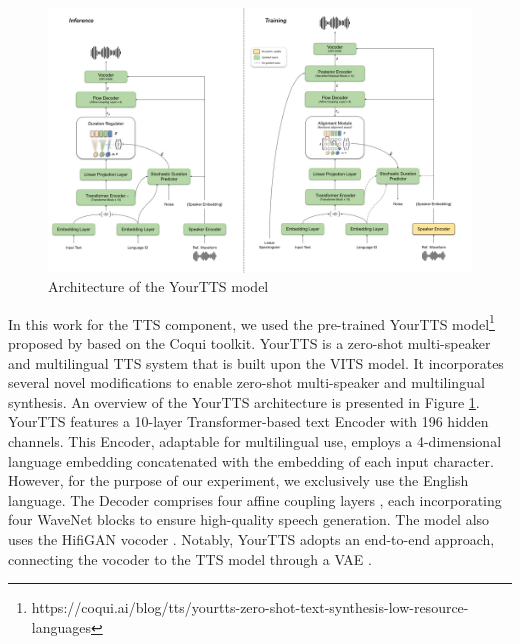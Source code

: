 \begin{figure}
    \begin{center}
        \includegraphics[scale=0.4]{imgs/YourTTS.png}
        \caption{Architecture of the YourTTS model\protect\footnotemark}
        \label{fig:YourTTS}
    \end{center}
\end{figure}

In this work for the \ac{TTS} component, we used the pre-trained YourTTS model\footnote{https://coqui.ai/blog/tts/yourtts-zero-shot-text-synthesis-low-resource-languages} proposed by \cite{casanova2022yourtts} based on the  Coqui toolkit. YourTTS is a zero-shot multi-speaker and multilingual \ac{TTS} system that is built upon the \ac{VITS} model. It incorporates several novel modifications to enable zero-shot multi-speaker and multilingual synthesis. An overview of the YourTTS architecture is presented in Figure \ref{fig:YourTTS}.
YourTTS features a 10-layer Transformer-based text Encoder with 196 hidden channels. This Encoder, adaptable for multilingual use, employs a 4-dimensional language embedding concatenated with the embedding of each input character. However, for the purpose of our experiment, we exclusively use the English language. The Decoder comprises four affine coupling layers \cite{45819}, each incorporating four WaveNet blocks \cite{45774} to ensure high-quality speech generation. The model also uses the HifiGAN vocoder \cite{kong2020hifi}. Notably, YourTTS adopts an end-to-end approach, connecting the vocoder to the \ac{TTS} model through a \ac{VAE} \cite{VAE}.


